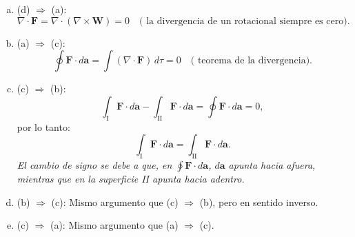 \documentclass[12pt]{article}
\begin{document}
\begin{enumerate}[(a)]
 \item  (d) \(\Rightarrow\) (a): 
     \[
     \nabla \cdot \mathbf{F} = \nabla \cdot (\nabla \times \mathbf{W}) = 0 \quad \text{( la divergencia de un rotacional siempre es cero).}
     \]
 
\item (a) \(\Rightarrow\) (c):
     \[
     \oint \mathbf{F} \cdot d\mathbf{a} = \int (\nabla \cdot \mathbf{F}) \, d\tau = 0 \quad \text{( teorema de la divergencia).}
     \]
 
\item (c) \(\Rightarrow\) (b):
     \[
     \int_{\text{I}} \mathbf{F} \cdot d\mathbf{a} - \int_{\text{II}} \mathbf{F} \cdot d\mathbf{a} = \oint \mathbf{F} \cdot d\mathbf{a} = 0,
     \]
     por lo tanto:
     \[
     \int_{\text{I}} \mathbf{F} \cdot d\mathbf{a} = \int_{\text{II}} \mathbf{F} \cdot d\mathbf{a}.
     \]
     \textit{ El cambio de signo se debe a que, en \(\oint \mathbf{F} \cdot d\mathbf{a}\), \(d\mathbf{a}\) apunta hacia afuera, mientras que en la superficie II apunta hacia adentro.}
 
\item  (b) \(\Rightarrow\) (c):
     Mismo argumento que (c) \(\Rightarrow\) (b), pero en sentido inverso. \\
\item  (c) \(\Rightarrow\) (a):
     Mismo argumento que (a) \(\Rightarrow\) (c).
\end{enumerate}
\end{document}
